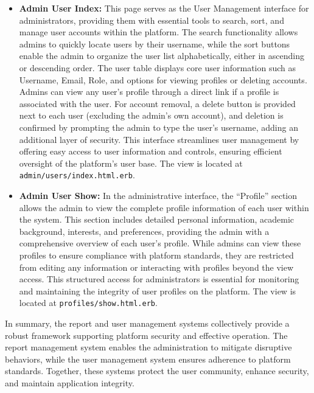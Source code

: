 \begin{enumerate}
\begin{itemize}
            \newpage
            \item \textbf{Admin User Index:} 
            This page serves as the User Management interface for administrators, providing them with essential tools to search, sort, and manage user accounts within the platform. The search functionality allows admins to quickly locate users by their username, while the sort buttons enable the admin to organize the user list alphabetically, either in ascending or descending order. The user table displays core user information such as Username, Email, Role, and options for viewing profiles or deleting accounts. Admins can view any user’s profile through a direct link if a profile is associated with the user. For account removal, a delete button is provided next to each user (excluding the admin’s own account), and deletion is confirmed by prompting the admin to type the user’s username, adding an additional layer of security. This interface streamlines user management by offering easy access to user information and controls, ensuring efficient oversight of the platform’s user base.
            The view is located at \texttt{admin/users/index.html.erb}.
    
            \item \textbf{Admin User Show:} 
            In the administrative interface, the “Profile” section allows the admin to view the complete profile information of each user within the system. This section includes detailed personal information, academic background, interests, and preferences, providing the admin with a comprehensive overview of each user’s profile. While admins can view these profiles to ensure compliance with platform standards, they are restricted from editing any information or interacting with profiles beyond the view access. This structured access for administrators is essential for monitoring and maintaining the integrity of user profiles on the platform. The view is located at \texttt{profiles/show.html.erb}.
            \end{itemize}\bigskip
        
        In summary, the report and user management systems collectively provide a robust framework supporting platform security and effective operation. The report management system enables the administration to mitigate disruptive behaviors, while the user management system ensures adherence to platform standards. Together, these systems protect the user community, enhance security, and maintain application integrity.
    \end{enumerate}

